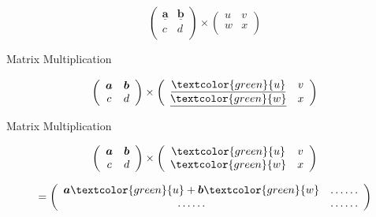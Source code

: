 {{{{			\[ \left(
			\begin{array}{cc}
			\underline{\boldsymbol{a}}& \underline{\boldsymbol{b}} \\
			c & d \\
			\end{array}
			\right) \times \left(
			\begin{array}{cc}
			u & v \\
			w & x \\
			\end{array}
			\right)
			\]
			
			{
				{Matrix Multiplication}
				
				{\huge
				
						\[ \left(
						\begin{array}{cc}
						\boldsymbol{a} & \boldsymbol{b} \\
						c & d \\
						\end{array}
						\right) \times \left(
						\begin{array}{cc}
						\underline{\textcolor{green}{u}} & v \\
						\underline{\textcolor{green}{w}} & x \\
						\end{array}
						\right)
						\]
						
						
						{Matrix Multiplication}
						
						{\huge
							
							\[ \left(
							\begin{array}{cc}
							\boldsymbol{a} & \boldsymbol{b} \\
							c & d \\
							\end{array}
							\right) \times \left(
							\begin{array}{cc}
							\textcolor{green}{u} & v \\
							\textcolor{green}{w} & x \\
							\end{array}
							\right)
							\]
							
							\[ = \left(
							\begin{array}{cc}
							\boldsymbol{a}\textcolor{green}{u} + \boldsymbol{b}\textcolor{green}{w}& \ldots \ldots\\
							\ldots \ldots & \ldots \ldots \\
							\end{array}
							\right) 
							\]
							
}}}}}}}

